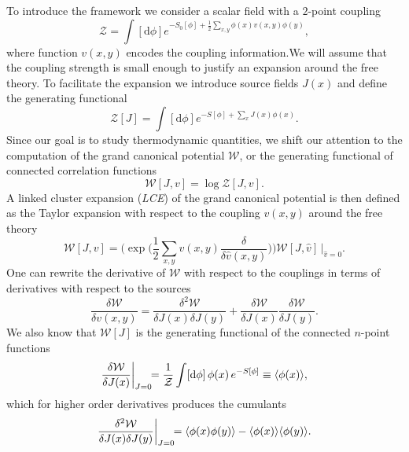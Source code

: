To introduce the framework we consider a scalar field with a $2$-point coupling
%
\begin{equation} \label{eq:scalar_field_Z}
  \mathcal{Z} = \int [\mathrm{d} \phi] e^{-S_0[\phi] + \frac{1}{2} \sum_{x,y}
    \phi(x) v(x,y) \phi(y)},
\end{equation}
%
where function $v(x,y)$ encodes the coupling information.We will assume that the
coupling strength is small enough to justify an expansion around the free
theory. To facilitate the expansion we introduce source fields $J(x)$ and define
the generating functional
%
\begin{equation}
  \mathcal{Z}[J] = \int [\mathrm{d} \phi] e^{-S[\phi] + \sum_x J(x) \phi(x)}.
\end{equation}
%
Since our goal is to study thermodynamic quantities, we shift our attention to
the computation of the grand canonical potential $\mathcal{W}$, or the generating functional
of connected correlation functions
%
\begin{equation}
  \mathcal{W}[J,v] = \log \mathcal{Z}[J,v].
\end{equation}
%
A linked cluster expansion (\emph{LCE}) of the grand canonical potential is then defined as
the Taylor expansion with respect to the coupling $v(x,y)$ around the free
theory
%
\begin{equation} \label{eq:cluster_expansion_def}
  \mathcal{W}[J,v] = \bigg( \exp \bigg(\frac{1}{2} \sum_{x,y} v(x,y)
    \frac{\delta}{\delta \hat{v}(x,y)} \bigg) \bigg) \mathcal{W}[J,\hat{v}]
    \,\Bigg|_{\hat{v}=0}.
\end{equation}
%
One can rewrite the derivative of $\mathcal{W}$ with respect to the couplings in
terms of derivatives with respect to the sources
%
\begin{equation}
  \frac{\delta \mathcal{W}}{\delta v(x,y)} = \frac{\delta^2 \mathcal{W}}{\delta
    J(x) \delta J(y)} + \frac{\delta \mathcal{W}}{\delta J(x)} \frac{\delta \mathcal{W}}{\delta J(y)}.
\end{equation}
%
We also know that $\mathcal{W}[J]$ is the generating functional of the
connected $n$-point functions 
%
\begin{equation}
  \frac{\delta \mathcal{W}}{\delta J(x)} \bigg|_{J=\mathrlap{0}} 
    = \frac{1}{\mathcal{Z}} \int [\mathrm{d} \phi] \, \phi(x) \, e^{-S[\phi]}
    \equiv \langle \phi(x) \rangle,
\end{equation}
%
which for higher order derivatives produces the cumulants
%
\begin{equation}
  \frac{\delta^2 \mathcal{W}}{\delta J(x) \delta J(y)} \bigg|_{J=\mathrlap{0}} 
    = \langle \phi(x) \phi(y) \rangle - \langle \phi(x) \rangle \langle \phi(y) \rangle.
\end{equation}
